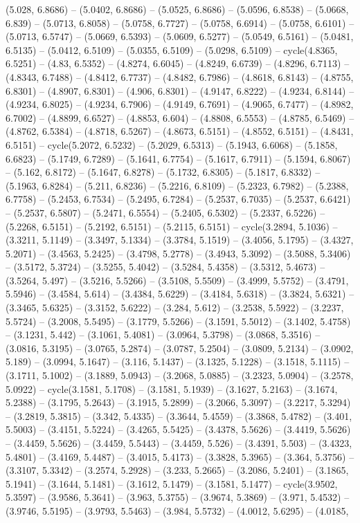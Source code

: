(5.028, 6.8686) -- (5.0402, 6.8686) -- (5.0525, 6.8686) -- (5.0596, 6.8538) -- (5.0668, 6.839) -- (5.0713, 6.8058) -- (5.0758, 6.7727) -- (5.0758, 6.6914) -- (5.0758, 6.6101) -- (5.0713, 6.5747) -- (5.0669, 6.5393) -- (5.0609, 6.5277) -- (5.0549, 6.5161) -- (5.0481, 6.5135) -- (5.0412, 6.5109) -- (5.0355, 6.5109) -- (5.0298, 6.5109) -- cycle(4.8365, 6.5251) -- (4.83, 6.5352) -- (4.8274, 6.6045) -- (4.8249, 6.6739) -- (4.8296, 6.7113) -- (4.8343, 6.7488) -- (4.8412, 6.7737) -- (4.8482, 6.7986) -- (4.8618, 6.8143) -- (4.8755, 6.8301) -- (4.8907, 6.8301) -- (4.906, 6.8301) -- (4.9147, 6.8222) -- (4.9234, 6.8144) -- (4.9234, 6.8025) -- (4.9234, 6.7906) -- (4.9149, 6.7691) -- (4.9065, 6.7477) -- (4.8982, 6.7002) -- (4.8899, 6.6527) -- (4.8853, 6.604) -- (4.8808, 6.5553) -- (4.8785, 6.5469) -- (4.8762, 6.5384) -- (4.8718, 6.5267) -- (4.8673, 6.5151) -- (4.8552, 6.5151) -- (4.8431, 6.5151) -- cycle(5.2072, 6.5232) -- (5.2029, 6.5313) -- (5.1943, 6.6068) -- (5.1858, 6.6823) -- (5.1749, 6.7289) -- (5.1641, 6.7754) -- (5.1617, 6.7911) -- (5.1594, 6.8067) -- (5.162, 6.8172) -- (5.1647, 6.8278) -- (5.1732, 6.8305) -- (5.1817, 6.8332) -- (5.1963, 6.8284) -- (5.211, 6.8236) -- (5.2216, 6.8109) -- (5.2323, 6.7982) -- (5.2388, 6.7758) -- (5.2453, 6.7534) -- (5.2495, 6.7284) -- (5.2537, 6.7035) -- (5.2537, 6.6421) -- (5.2537, 6.5807) -- (5.2471, 6.5554) -- (5.2405, 6.5302) -- (5.2337, 6.5226) -- (5.2268, 6.5151) -- (5.2192, 6.5151) -- (5.2115, 6.5151) -- cycle(3.2894, 5.1036) -- (3.3211, 5.1149) -- (3.3497, 5.1334) -- (3.3784, 5.1519) -- (3.4056, 5.1795) -- (3.4327, 5.2071) -- (3.4563, 5.2425) -- (3.4798, 5.2778) -- (3.4943, 5.3092) -- (3.5088, 5.3406) -- (3.5172, 5.3724) -- (3.5255, 5.4042) -- (3.5284, 5.4358) -- (3.5312, 5.4673) -- (3.5264, 5.497) -- (3.5216, 5.5266) -- (3.5108, 5.5509) -- (3.4999, 5.5752) -- (3.4791, 5.5946) -- (3.4584, 5.614) -- (3.4384, 5.6229) -- (3.4184, 5.6318) -- (3.3824, 5.6321) -- (3.3465, 5.6325) -- (3.3152, 5.6222) -- (3.284, 5.612) -- (3.2538, 5.5922) -- (3.2237, 5.5724) -- (3.2008, 5.5495) -- (3.1779, 5.5266) -- (3.1591, 5.5012) -- (3.1402, 5.4758) -- (3.1231, 5.442) -- (3.1061, 5.4081) -- (3.0964, 5.3798) -- (3.0868, 5.3516) -- (3.0816, 5.3195) -- (3.0765, 5.2874) -- (3.0787, 5.2504) -- (3.0809, 5.2134) -- (3.0902, 5.189) -- (3.0994, 5.1647) -- (3.116, 5.1437) -- (3.1325, 5.1228) -- (3.1518, 5.1115) -- (3.1711, 5.1002) -- (3.1889, 5.0943) -- (3.2068, 5.0885) -- (3.2323, 5.0904) -- (3.2578, 5.0922) -- cycle(3.1581, 5.1708) -- (3.1581, 5.1939) -- (3.1627, 5.2163) -- (3.1674, 5.2388) -- (3.1795, 5.2643) -- (3.1915, 5.2899) -- (3.2066, 5.3097) -- (3.2217, 5.3294) -- (3.2819, 5.3815) -- (3.342, 5.4335) -- (3.3644, 5.4559) -- (3.3868, 5.4782) -- (3.401, 5.5003) -- (3.4151, 5.5224) -- (3.4265, 5.5425) -- (3.4378, 5.5626) -- (3.4419, 5.5626) -- (3.4459, 5.5626) -- (3.4459, 5.5443) -- (3.4459, 5.526) -- (3.4391, 5.503) -- (3.4323, 5.4801) -- (3.4169, 5.4487) -- (3.4015, 5.4173) -- (3.3828, 5.3965) -- (3.364, 5.3756) -- (3.3107, 5.3342) -- (3.2574, 5.2928) -- (3.233, 5.2665) -- (3.2086, 5.2401) -- (3.1865, 5.1941) -- (3.1644, 5.1481) -- (3.1612, 5.1479) -- (3.1581, 5.1477) -- cycle(3.9502, 5.3597) -- (3.9586, 5.3641) -- (3.963, 5.3755) -- (3.9674, 5.3869) -- (3.971, 5.4532) -- (3.9746, 5.5195) -- (3.9793, 5.5463) -- (3.984, 5.5732) -- (4.0012, 5.6295) -- (4.0185, 